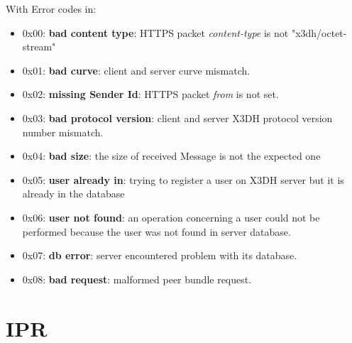 \documentclass[a4paper,11pt]{article}
\begin{document}
    With Error codes in:
    \begin{itemize}
      \item 0x00: \textbf{bad content type}: HTTPS packet \textit{content-type} is not "x3dh/octet-stream"
      \item 0x01: \textbf{bad curve}: client and server curve mismatch.
      \item 0x02: \textbf{missing Sender Id}: HTTPS packet \textit{from} is not set.
      \item 0x03: \textbf{bad protocol version}: client and server X3DH protocol version number mismatch.
      \item 0x04: \textbf{bad size}: the size of received Message is not the expected one
      \item 0x05: \textbf{user already in}: trying to register a user on X3DH server but it is already in the database
      \item 0x06: \textbf{user not found}: an operation concerning a user could not be performed because the user was not found in server database.
      \item 0x07: \textbf{db error}: server encountered problem with its database.
      \item 0x08: \textbf{bad request}: malformed peer bundle request.
    \end{itemize}
\section{IPR}
\end{document}
